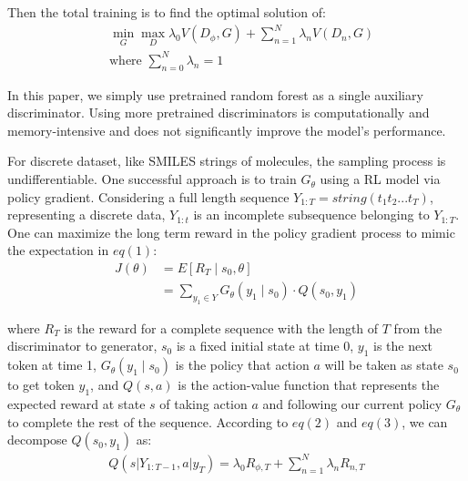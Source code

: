 \documentclass[10pt, twocolumn]{article}
\begin{document}
Then the total training is to find the optimal solution of:
\begin{equation}
\begin{aligned}
&\min_{G}\max_{D}\lambda_0 V(D_{\phi},G) + \sum_{n=1}^N\lambda_nV(D_n,G) \\
&\text{where }\sum_{n=0}^N\lambda_n=1
\end{aligned}
\tag{3}
\end{equation}

In this paper, we simply use pretrained random forest as a single auxiliary discriminator. Using more pretrained discriminators is computationally and memory-intensive and does not significantly improve the model's performance.

For discrete dataset, like SMILES strings of molecules, the sampling process is undifferentiable. One successful approach is to train $G_{\theta}$ using a RL model via policy gradient\cite{Williams1992,Yu2016,Guimaraes2017}. Considering a full length sequence $Y_{1:T} = string(t_1t_2...t_T)$, representing a discrete data, $Y_{1:t}$ is an incomplete subsequence belonging to $Y_{1:T}$. One can maximize the long term reward in the policy gradient process to mimic the expectation in $eq(1)$:
\begin{equation}
\begin{aligned}
J(\theta)&=E\left[R_{T} \mid s_{0}, \theta\right] \\
&=\sum_{y_{1} \in Y} G_{\theta}\left(y_{1} \mid s_{0}\right) \cdot Q\left(s_{0}, y_{1}\right)
\end{aligned}
\tag{4}
\end{equation}

where $R_{T}$ is the reward for a complete sequence with the length of $T$ from the discriminator to generator, $s_{0}$ is a fixed initial state at time 0, $y_{1}$ is the next token at time 1, $G_{\theta}\left(y_{1} \mid s_{0}\right)$ is the policy that action $a$ will be taken as state $s_{0}$ to get token $y_{1}$, and $Q(s,a)$ is the action-value function that represents the expected reward at state $s$ of taking action $a$ and following our current policy $G_{\theta}$ to complete the rest of the sequence. According to $eq(2)$ and $eq(3)$, we can decompose $Q\left(s_{0}, y_{1}\right)$ as:
\begin{equation}
\begin{aligned}
Q\left(s|Y_{1: T-1}, a|y_{T}\right)=\lambda_0 R_{\phi,T} + \sum_{n=1}^N\lambda_nR_{n,T} \\
\end{aligned}
\tag{5}
\end{equation}
\end{document}

